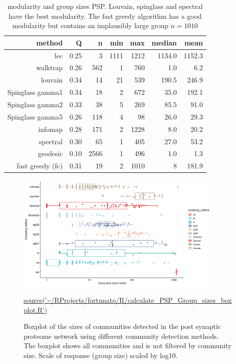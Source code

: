 \begin{table}[ht]
\centering

\begin{tabular}{rrrrrrr}
  \toprule
method & Q & n & min & max & median & mean \\ 
  \midrule
lec & 0.25 & 3 & 1111 & 1212 & 1134.0 & 1152.3 \\ 
  walktrap & 0.26 & 562 & 1 & 760 & 1.0 & 6.2 \\ 
  louvain & 0.34 & 14 & 21 & 539 & 190.5 & 246.9 \\ 
  Spinglass gamma1 & 0.34 & 18 & 2 & 672 & 35.0 & 192.1 \\ 
  Spinglass gamma2 & 0.33 & 38 & 5 & 269 & 85.5 & 91.0 \\ 
  Spinglass gamma5 & 0.26 & 118 & 4 & 98 & 26.0 & 29.3 \\ 
  infomap & 0.28 & 171 & 2 & 1228 & 8.0 & 20.2 \\ 
  spectral & 0.30 & 65 & 1 & 405 & 27.0 & 53.2 \\ 
  geodesic & 0.10 & 2566 & 1 & 496 & 1.0 & 1.3 \\ 
  fast greedy (fc) & 0.31 & 19 & 2 & 1010 & 8 & 181.9 \\
   \bottomrule
\end{tabular}
\caption[[Modularity and group size for different clustering modalities PSP]{modularity and group sizes PSP. Louvain, spinglass and spectral have the best modularity. The fast greedy algorithm has a good modularity but contains an implausibly large group $n=1010$} 
\label{tab:modularity and group sizes PSP xtable}
\end{table}

\begin{figure}
    \centering
    \includegraphics[width=0.9\textwidth]{images/Rplot_boxplot_group_sizes_different_methods_size_1_or_greater.png}
    \caption{Boxplot of  
    the sizes of communities detected in the post synaptic proteome network using different community detection methods. The boxplot shows all communities and is not filtered by community size. Scale of response (group size) scaled by log10.}
    \tiny\url{source('~/RProjects/fortunato/R/calculate_PSP_Group_sizes_boxplot.R')}
    \label{fig:community_sizes_no_size_filter}
\end{figure}


